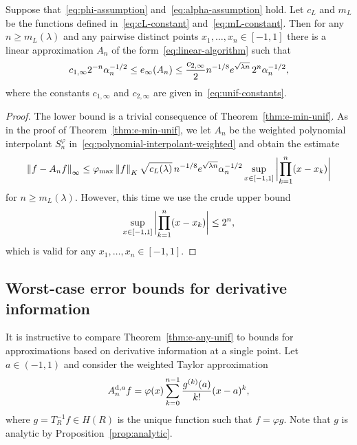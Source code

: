 \documentclass{mcom-l}
\numberwithin{equation}{section}
\numberwithin{theorem}{section} %
\begin{document}
\begin{theorem} \label{thm:e-any-unif}
  Suppose that~\eqref{eq:phi-assumption} and~\eqref{eq:alpha-assumption} hold.
  Let $c_L$ and $m_L$ be the functions defined in~\eqref{eq:cL-constant} and~\eqref{eq:mL-constant}.
  Then for any $n \geq m_L(\lambda)$ and any pairwise distinct points $x_1, \ldots, x_n \in [-1, 1]$ there is a linear approximation $A_n$ of the form~\eqref{eq:linear-algorithm} such that
  \begin{equation*}
    c_{1,\infty} 2^{-n} \alpha_n^{-1/2} \leq e_\infty(A_n) \leq  \frac{c_{2,\infty}}{2}  n^{-1/8} e^{\sqrt{\smash[b]{\lambda n}}} \, 2^{n} \alpha_n^{-1/2},
  \end{equation*}
  where the constants $c_{1,\infty}$ and $c_{2,\infty}$ are given in~\eqref{eq:unif-constants}.
\end{theorem}
\begin{proof}
  The lower bound is a trivial consequence of Theorem~\ref{thm:e-min-unif}.
  As in the proof of Theorem~\ref{thm:e-min-unif}, we let $A_n$ be the weighted polynomial interpolant $S_n^\varphi$ in~\eqref{eq:polynomial-interpolant-weighted} and obtain the estimate
  \begin{equation*}
    \norm[0]{ f - A_n f }_\infty \leq \varphi_{\max} \norm[0]{f}_K \sqrt{c_L(\lambda)} \, n^{-1/8} e^{\sqrt{\smash[b]{\lambda n}}} \alpha_n^{-1/2} \sup_{x \in [-1, 1]} \, \abs[3]{ \prod_{k=1}^n (x - x_k) }
  \end{equation*}
  for $n \geq m_L(\lambda)$.
  However, this time we use the crude upper bound
  \begin{equation*}
    \sup_{x \in [-1, 1]} \, \abs[3]{ \prod_{k=1}^n (x - x_k) } \leq 2^n,
  \end{equation*}
  which is valid for any $x_1, \ldots, x_n \in [-1, 1]$.
\end{proof}

\subsection{Worst-case error bounds for derivative information} \label{sec:derivative-information}

It is instructive to compare Theorem~\ref{thm:e-any-unif} to bounds for approximations based on derivative information at a single point.
Let $a \in (-1, 1)$ and consider the weighted Taylor approximation
\begin{equation*}
  A_n^{\textup{d},a} f = \varphi(x) \sum_{k=0}^{n-1} \frac{g^{(k)}(a)}{k!} (x - a)^k,
\end{equation*}
where $g = T_R^{-1} f \in H(R)$ is the unique function such that $f = \varphi g$.
Note that $g$ is analytic by Proposition~\ref{prop:analytic}.
\end{document}
